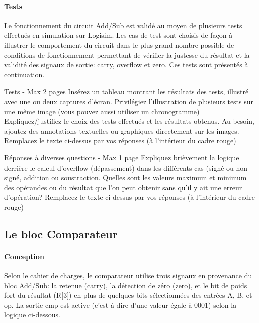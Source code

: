 \documentclass[a4paper]{article}
\begin{document}
\paragraph{Tests} 
Le fonctionnement du circuit Add/Sub est validé au moyen de plusieurs tests effectués en  simulation sur Logisim. Les cas de test sont choisis de façon à illustrer le comportement du circuit dans le plus grand nombre possible de conditions de fonctionnement permettant de vérifier la justesse du résultat et la validité des signaux de sortie: carry, overflow et zero. Ces tests sont présentés à continuation.

\begin{tcolorbox}[colframe=Monokaimagenta,colback=white]
Tests - Max 2 pages 
Insérez  un tableau montrant les résultats des tests, illustré avec une ou deux captures d’écran. Privilégiez l’illustration de plusieurs tests sur une même image (vous pouvez aussi utiliser un chronogramme)
Expliquez/justifiez le choix des tests effectués et les résultats obtenus.
Au besoin, ajoutez des annotations textuelles ou graphiques directement sur les images.
Remplacez le texte ci-dessus par vos réponses (à l’intérieur du cadre rouge)
\end{tcolorbox}

\begin{tcolorbox}[colframe=Monokaimagenta,colback=white]
Réponses à diverses questions - Max 1 page
Expliquez brièvement la logique derrière le calcul d’overflow (dépassement) dans les différents cas (signé ou non-signé, addition ou soustraction.
Quelles sont les valeurs maximum et minimum des opérandes ou du résultat que l’on peut obtenir sans qu’il y ait une erreur d’opération?
Remplacez le texte ci-dessus par vos réponses (à l’intérieur du cadre rouge)
\end{tcolorbox}

\subsection{Le bloc Comparateur}
\label{comp}
\paragraph{Conception} Selon le cahier de charges, le comparateur utilise trois signaux en provenance du bloc Add/Sub: la retenue (carry), la détection de zéro (zero), et le bit de poids fort du résultat (R[3]) en plus de quelques bits sélectionnées des entrées A, B, et op. La sortie cmp est active (c’est à dire d’une valeur égale à 0001) selon la logique ci-dessous.
\end{document}

